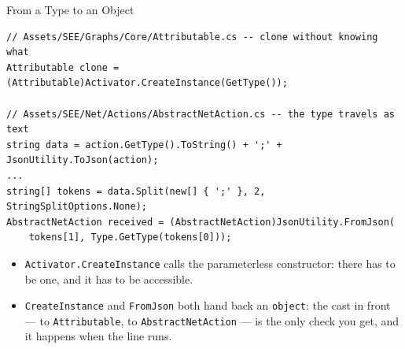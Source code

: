 \begin{frame}[fragile]{From a Type to an Object}
  \begin{lstlisting}[basicstyle=\scriptsize\ttfamily]
// Assets/SEE/Graphs/Core/Attributable.cs -- clone without knowing what
Attributable clone = (Attributable)Activator.CreateInstance(GetType());

// Assets/SEE/Net/Actions/AbstractNetAction.cs -- the type travels as text
string data = action.GetType().ToString() + ';' + JsonUtility.ToJson(action);
...
string[] tokens = data.Split(new[] { ';' }, 2, StringSplitOptions.None);
AbstractNetAction received = (AbstractNetAction)JsonUtility.FromJson(
    tokens[1], Type.GetType(tokens[0]));
  \end{lstlisting}
  \vspace{1ex}

  \begin{itemize}
    \item \texttt{Activator.CreateInstance} calls the parameterless
      constructor: there has to be one, and it has to be accessible.
    \item \texttt{CreateInstance} and \texttt{FromJson} both hand back an
      \texttt{object}: the cast in front --- to \texttt{Attributable}, to
      \texttt{AbstractNetAction} --- is the only check you get, and it happens
      when the line runs.
  \end{itemize}
\end{frame}


